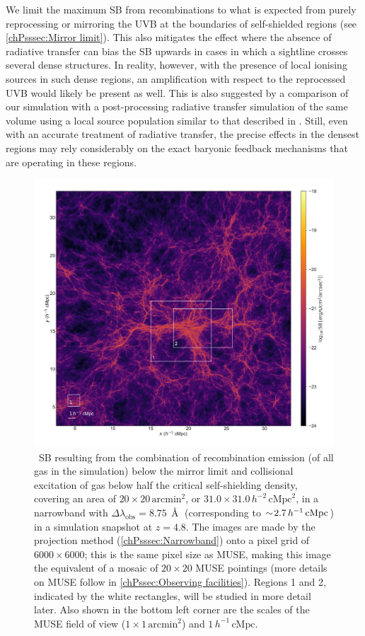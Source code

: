 We limit the maximum SB from recombinations to what is expected from purely reprocessing or mirroring the UVB at the boundaries of self-shielded regions (see \cref{chPsssec:Mirror limit}). This also mitigates the effect where the absence of radiative transfer can bias the SB upwards in cases in which a sightline crosses several dense structures. In reality, however, with the presence of local ionising sources in such dense regions, an amplification with respect to the reprocessed UVB would likely be present as well. This is also suggested by a comparison of our simulation with a post-processing radiative transfer simulation of the same volume using a local source population similar to that described in \citet{2019MNRAS.485L..24K}. Still, even with an accurate treatment of radiative transfer, the precise effects in the densest regions may rely considerably on the exact baryonic feedback mechanisms that are operating in these regions.
\begin{figure}
    \centering
    \includegraphics[width=\linewidth]{"Plots/ChapterP/Overview_SB_map"}
    \caption[Total \lya\ surface brightness at $z=4.8$]
    {\lya\ SB resulting from the combination of recombination emission (of all gas in the simulation) below the mirror limit and collisional excitation of gas below half the critical self-shielding density, covering an area of $20 \times 20 \, \mathrm{arcmin}^2$, or $31.0 \times 31.0 \, h^{-2} \, \mathrm{cMpc}^2$, in a narrowband with $\Delta \lambda_\text{obs} = 8.75 \, \Angstrom$ (corresponding to $\sim \! 2.7 \, h^{-1} \, \mathrm{cMpc}$) in a simulation snapshot at $z=4.8$. The images are made by the projection method (\cref{chPsssec:Narrowband}) onto a pixel grid of $6000 \times 6000$; this is the same pixel size as MUSE, making this image the equivalent of a mosaic of $20 \times 20$ MUSE pointings (more details on MUSE follow in \cref{chPssec:Observing facilities}). Regions 1 and 2, indicated by the white rectangles, will be studied in more detail later. Also shown in the bottom left corner are the scales of the MUSE field of view ($1 \times 1 \, \mathrm{arcmin}^2$) and $1 \, h^{-1} \, \mathrm{cMpc}$.}
    \label{chPfig:SB}
\end{figure}
